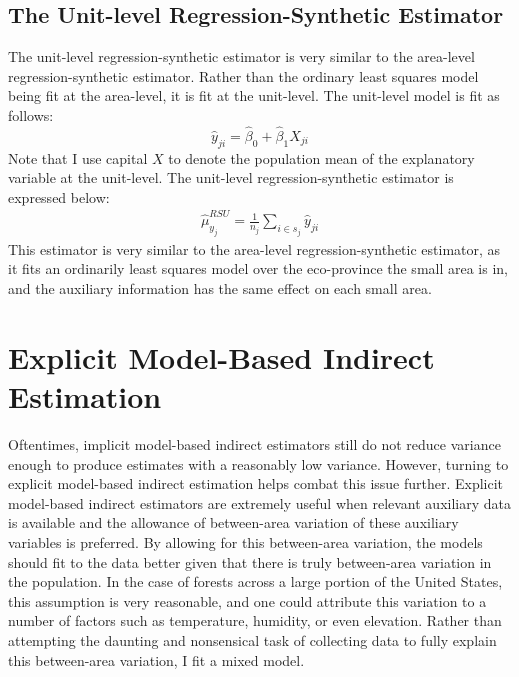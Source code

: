 \documentclass[12pt,twoside]{reedthesis}
\begin{document}
\hypertarget{the-unit-level-regression-synthetic-estimator}{%
\subsection{The Unit-level Regression-Synthetic Estimator}\label{the-unit-level-regression-synthetic-estimator}}

The unit-level regression-synthetic estimator is very similar to the area-level regression-synthetic estimator. Rather than the ordinary least squares model being fit at the area-level, it is fit at the unit-level. The unit-level model is fit as follows:
\[
\hat y_{ji} = \hat\beta_0 + \hat\beta_1 X_{ji}
\]
Note that I use capital \(X\) to denote the population mean of the explanatory variable at the unit-level. The unit-level regression-synthetic estimator is expressed below:
\begin{align}
\hat\mu_{y_j}^{RSU} = \frac{1}{n_j} \sum_{i \in s_j} \hat y_{ji}
\end{align}
This estimator is very similar to the area-level regression-synthetic estimator, as it fits an ordinarily least squares model over the eco-province the small area is in, and the auxiliary information has the same effect on each small area.

\hypertarget{explicit-model-based-indirect-estimation}{%
\section{Explicit Model-Based Indirect Estimation}\label{explicit-model-based-indirect-estimation}}

Oftentimes, implicit model-based indirect estimators still do not reduce variance enough to produce estimates with a reasonably low variance. However, turning to explicit model-based indirect estimation helps combat this issue further. Explicit model-based indirect estimators are extremely useful when relevant auxiliary data is available and the allowance of between-area variation of these auxiliary variables is preferred. By allowing for this between-area variation, the models should fit to the data better given that there is truly between-area variation in the population. In the case of forests across a large portion of the United States, this assumption is very reasonable, and one could attribute this variation to a number of factors such as temperature, humidity, or even elevation. Rather than attempting the daunting and nonsensical task of collecting data to fully explain this between-area variation, I fit a mixed model.
\end{document}
